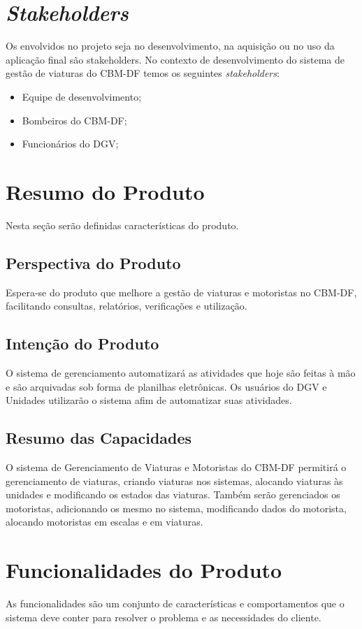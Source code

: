 	\section{\textit{Stakeholders}}
Os envolvidos no projeto seja no desenvolvimento, na aquisição ou no uso da aplicação final são stakeholders. 
No contexto de desenvolvimento do sistema de gestão de viaturas do CBM-DF temos os seguintes \textit{stakeholders}:
\begin{itemize}
 \item Equipe de desenvolvimento;
 \item Bombeiros do CBM-DF;
 \item Funcionários do DGV;
\end{itemize}
	\section{Resumo do Produto}
Nesta seção serão definidas características do produto.
		\subsection{Perspectiva do Produto}
Espera-se do produto que melhore a gestão de viaturas e motoristas no CBM-DF, facilitando consultas, 
relatórios, verificações e utilização.
		\subsection{Intenção do Produto}
O sistema de gerenciamento automatizará as atividades que hoje são feitas à mão e são arquivadas sob forma de 
planilhas eletrônicas. Os usuários do DGV e Unidades utilizarão o sistema afim de automatizar suas atividades.
		\subsection{Resumo das Capacidades}
O sistema de Gerenciamento de Viaturas e Motoristas do CBM-DF permitirá o gerenciamento de viaturas, 
criando viaturas nos sistemas, alocando viaturas às unidades e modificando os estados das viaturas. 
Também serão gerenciados os motoristas, adicionando os mesmo no sistema, modificando dados do motorista, 
alocando motoristas em escalas e em viaturas.
	\section{Funcionalidades do Produto}
As funcionalidades são um conjunto de características e comportamentos que o sistema deve conter para resolver 
o problema e as necessidades do cliente.

